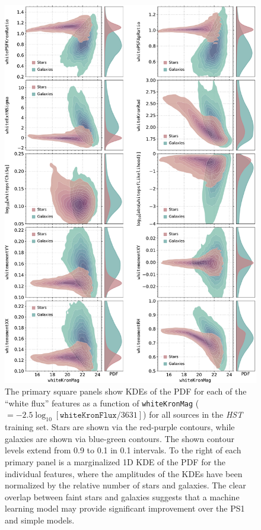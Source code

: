 \documentclass[twocolumn]{aastex62}
\begin{document}
\begin{figure}[htb]
 \centering
  \includegraphics[width=5.75in]{./Figures/whiteFeatures.pdf}
  \caption{
  The primary square panels show KDEs of the PDF for each of the ``white
  flux'' features as a function of \texttt{whiteKronMag}
  ($=-2.5\log_{10}[\mathtt{whiteKronFlux}/3631]$) for all sources in the
  \textit{HST} training set. Stars are shown via the red-purple contours,
  while galaxies are shown via blue-green contours. The shown contour levels
  extend from 0.9 to 0.1 in 0.1 intervals. To the right of each primary panel
  is a marginalized 1D KDE of the PDF for the individual features, where the
  amplitudes of the KDEs have been normalized by the relative number of stars
  and galaxies. The clear overlap between faint stars and galaxies suggests
  that a machine learning model may provide significant improvement over the
  PS1 and simple models.}
  \label{fig:features}
\end{figure}
\end{document}
